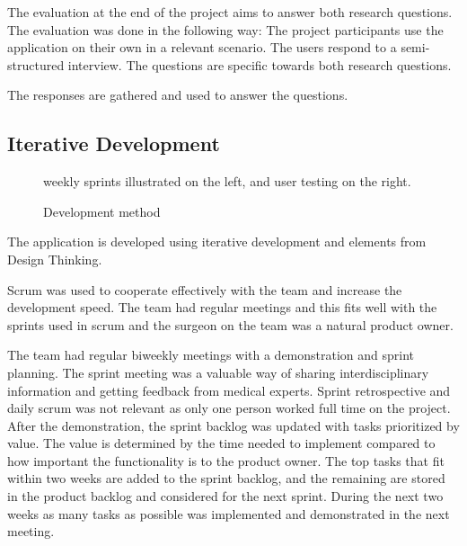 \documentclass[a4paper]{report}
\begin{document}
The evaluation at the end of the project aims to answer both research questions. The evaluation was done in the following way:
The project participants use the application on their own in a relevant scenario.
The users respond to a semi-structured interview. The questions are specific towards both research questions.

The responses are gathered and used to answer the questions.

\subsection{Iterative Development}

\begin{figure}[h!]
    \centering
	\hfill
  \caption{Development method}
  \small
  weekly sprints illustrated on the left, and user testing on the right.
\end{figure}

The application is developed using iterative development and elements from Design Thinking.

Scrum was used to cooperate effectively with the team and increase the development speed. The team had regular meetings and this fits well with the sprints used in scrum and the surgeon on the team was a natural product owner.

The team had regular biweekly meetings with a demonstration and sprint planning. The sprint meeting was a valuable way of sharing interdisciplinary information and getting feedback from medical experts. Sprint retrospective and daily scrum was not relevant as only one person worked full time on the project.
After the demonstration, the sprint backlog was updated with tasks prioritized by value. The value is determined by the time needed to implement compared to how important the functionality is to the product owner. The top tasks that fit within two weeks are added to the sprint backlog, and the remaining are stored in the product backlog and considered for the next sprint.
During the next two weeks as many tasks as possible was implemented and demonstrated in the next meeting.
\end{document}
